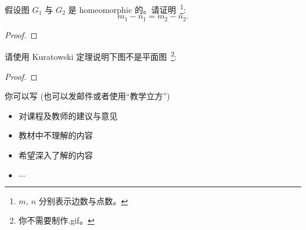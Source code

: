 \documentclass[a4paper, justified]{tufte-handout}
\begin{document}
\begin{problem}
  假设图 $G_{1}$ 与 $G_{2}$ 是 homeomorphic 的。请证明~\footnote{
    $m$, $n$ 分别表示边数与点数。
  }:
  \[
    m_{1} - n_{1} = m_{2} - n_{2}.
  \]
\end{problem}

\begin{proof}
\end{proof}

\begin{problem}
  请使用 Kuratowski 定理说明下图不是平面图~\footnote{你不需要制作\textsf{.gif}。}:
\end{problem}

\begin{proof}
\end{proof}

\begincorrection

\beginfb

你可以写 (也可以发邮件或者使用``教学立方'')
\begin{itemize}
  \item 对课程及教师的建议与意见
  \item 教材中不理解的内容
  \item 希望深入了解的内容
  \item $\cdots$
\end{itemize}
\end{document}
